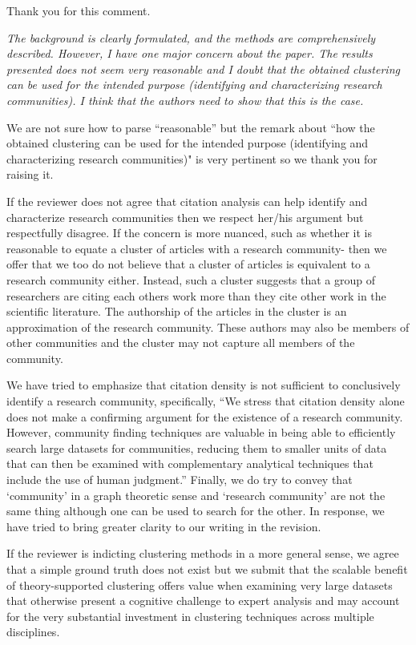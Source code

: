 \documentclass[11pt, oneside]{article}   	%
\begin{document}
Thank you for this comment.

\emph{The background is clearly formulated, and the methods are comprehensively described. However, I have one major concern about the paper. The results presented does not seem very reasonable and I doubt that the obtained clustering can be used for the intended purpose (identifying and characterizing research communities). I think that the authors need to show that this is the case.}

We are not sure how to parse ``reasonable'' but the remark about ``how the obtained clustering can be used for the intended purpose (identifying and characterizing research communities)" is very pertinent so we thank you for raising it.

If the reviewer does not agree that citation analysis can help identify and characterize research communities then we respect her/his argument but respectfully disagree. If the concern is more nuanced, such as whether it is reasonable to equate a cluster of articles with a research community-  then we offer that we too do not believe that a cluster of articles is equivalent to a research community either. Instead, such a cluster suggests that a group of researchers are citing each others work more than they cite other work in the scientific literature. The authorship of the articles in the cluster is an approximation of the research community. These authors may also be members of other communities and the cluster may not capture all members of the community. 

We have tried to emphasize that citation density is not sufficient to conclusively identify a research community, specifically, ``We stress that citation density alone does not make a confirming argument for the existence of a research community. However, community finding techniques are valuable in being able to efficiently search large datasets for communities, reducing them to smaller units of data that can then be examined with complementary analytical techniques that include the use of human judgment.'' Finally, we do try to convey that `community' in a graph theoretic sense and `research community' are not the same thing although one can be used to search for the other.  In response, we have tried to bring greater clarity to our writing in the revision. 

If the reviewer is indicting clustering methods in a more general sense, we agree that a simple ground truth does not exist but we submit that the scalable benefit of theory-supported clustering offers value when examining very large datasets that otherwise present a cognitive challenge to expert analysis and may account for the very substantial investment in clustering techniques across multiple disciplines. 
\end{document}
